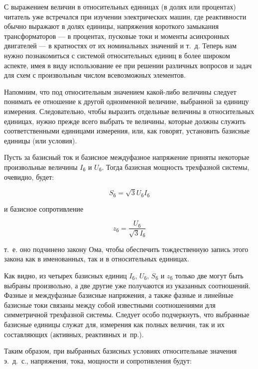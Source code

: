 С выражением величин в относительных единицах (в долях или процентах) читатель уже встречался при изучении электрических машин, где реактивности обычно выражают в долях единицы, напряжения короткого замыкания трансформаторов --- в процентах, пусковые токи и моменты асинхронных двигателей --- в кратностях от их номинальных значений и т.~д. Теперь нам нужно познакомиться с системой относительных единиц в более широком аспекте, имея в виду использование ее при решении различных вопросов и задач для схем с произвольным числом всевозможных элементов.

Напомним, что под относительным значением какой-либо величины следует понимать ее отношение к другой одноименной величине, выбранной за единицу измерения. Следовательно, чтобы выразить отдельные величины в относительных единицах, нужно прежде всего выбрать те величины, которые должны служить соответственными единицами измерения, или, как говорят, установить базисные единицы (или условия).

Пусть за базисный ток и базисное междуфазное напряжение приняты некоторые произвольные величины $ I_{\text{б}} $ и $ U_{\text{б}} $. Тогда базисная мощность трехфазной системы, очевидно, будет:

\begin{equation} %
	\label{eq:2-1 S_baz}
	S_{\text{б}} = \sqrt{3}U_{\text{б}}I_{\text{б}}
\end{equation}

и базисное сопротивление

\begin{equation} %
	\label{eq:2-2 z_baz}
	z_{\text{б}} = \frac{U_{\text{б}}}{\sqrt{3}I_{\text{б}}}
\end{equation}

т.~е. оно подчинено закону Ома, чтобы обеспечить тождественную запись этого закона как в именованных, так и в относительных единицах.

Как видно, из четырех базисных единиц $ I_{\text{б}} $, $ U_{\text{б}} $, $ S_{\text{б}} $ и $ z_{\text{б}} $ только две могут быть выбраны произвольно, а две другие уже получаются из указанных соотношений. Фазные и междуфазные базисные напряжения, а также фазные и линейные базисные токи связаны между собой известными соотношениями для симметричной трехфазной системы. Следует особо подчеркнуть, что выбранные базисные единицы служат для, измерения как полных величин, так и их составляющих (активных, реактивных и~пр.).

Таким образом, при выбранных базисных условиях относительные значения э.~д.~с., напряжения, тока, мощности и сопротивления будут:

